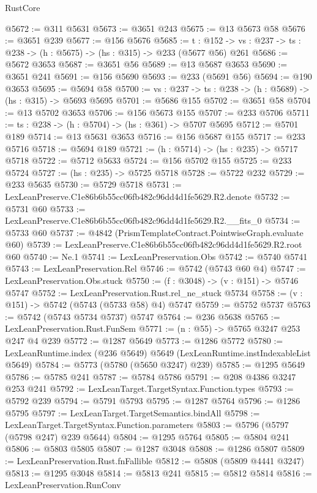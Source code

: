 \begin{lexlean}{RustCore}
\begin{coremodule}
@5672 := @311 @5631
@5673 := @3651 @243
@5675 := @13 @5673 @58
@5676 := @3651 @239
@5677 := @156 @5676
@5685 := {t : @152} ->
  {vs : @237} -> {ts : @238} -> (h : @5675) -> (hs : @315) -> @233 (@5677 @56) @261
@5686 := @5672 @3653
@5687 := @3651 @56
@5689 := @13 @5687 @3653
@5690 := @3651 @241
@5691 := @156 @5690
@5693 := @233 (@5691 @56)
@5694 := @190 @3653
@5695 := @5694 @58
@5700 := {vs : @237} -> {ts : @238} -> (h : @5689) -> (hs : @315) -> @5693 @5695
@5701 := @5686 @155
@5702 := @3651 @58
@5704 := @13 @5702 @3653
@5706 := @156 @5673 @155
@5707 := @233 @5706
@5711 := {ts : @238} -> (h : @5704) -> (hs : @361) -> @5707 @5695
@5712 := @5701 @189
@5714 := @13 @5631 @3653
@5716 := @156 @5687 @155
@5717 := @233 @5716
@5718 := @5694 @189
@5721 := (h : @5714) -> (hs : @235) -> @5717 @5718
@5722 := @5712 @5633
@5724 := @156 @5702 @155
@5725 := @233 @5724
@5727 := (hs : @235) -> @5725 @5718
@5728 := @5722 @232
@5729 := @233 @5635
@5730 := @5729 @5718
@5731 := LexLeanPreserve.C1e86b6b55cc06fb482c96dd4d1fe5629.R2.denote
@5732 := @5731 @60
@5733 := LexLeanPreserve.C1e86b6b55cc06fb482c96dd4d1fe5629.R2.__fits_0
@5734 := @5733 @60
@5737 := @4842 (PrismTemplateContract.PointwiseGraph.evaluate @60)
@5739 := LexLeanPreserve.C1e86b6b55cc06fb482c96dd4d1fe5629.R2.root @60
@5740 := Ne.{1}
@5741 := LexLeanPreservation.Obs
@5742 := @5740 @5741
@5743 := LexLeanPreservation.Rel
@5746 := @5742 (@5743 @60 @4)
@5747 := LexLeanPreservation.Obs.stuck
@5750 := (f : @3048) -> (v : @151) -> @5746 @5747
@5752 := LexLeanPreservation.Rust.rel_ne_stuck @5734
@5758 := (v : @151) -> @5742 (@5743 (@5733 @58) @4) @5747
@5759 := @5752 @5737
@5763 := @5742 (@5743 @5734 @5737) @5747
@5764 := @236 @5638
@5765 := LexLeanPreservation.Rust.FunSem
@5771 := (n : @55) -> @5765 @3247 @253 @247 @4 @239
@5772 := @1287 @5649
@5773 := @1286 @5772
@5780 := LexLeanRuntime.index (@236 @5649) @5649 (LexLeanRuntime.instIndexableList @5649)
@5784 := @5773 (@5780 (@5650 @3247) @239)
@5785 := @1295 @5649
@5786 := @5785 @241
@5787 := @5784 @5786
@5791 := @208 @4386 @3247 @253 @241
@5792 := LexLeanTarget.TargetSyntax.Function.types
@5793 := @5792 @239
@5794 := @5791 @5793
@5795 := @1287 @5764
@5796 := @1286 @5795
@5797 := LexLeanTarget.TargetSemantics.bindAll
@5798 := LexLeanTarget.TargetSyntax.Function.parameters
@5803 := @5796 (@5797 (@5798 @247) @239 @5644)
@5804 := @1295 @5764
@5805 := @5804 @241
@5806 := @5803 @5805
@5807 := @1287 @3048
@5808 := @1286 @5807
@5809 := LexLeanPreservation.Rust.fnFallible
@5812 := @5808 (@5809 @4441 @3247)
@5813 := @1295 @3048
@5814 := @5813 @241
@5815 := @5812 @5814
@5816 := LexLeanPreservation.RunConv

\end{coremodule}
\end{lexlean}
